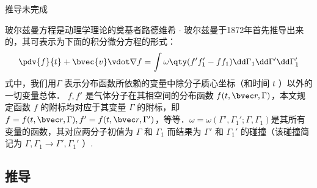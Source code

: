 
\begin{issues}

\issueDraft
推导未完成
\end{issues}

玻尔兹曼方程是动理学理论的奠基者路德维希 $\cdot$ 玻尔兹曼于1872年首先推导出来的，其可表示为下面的积分微分方程的形式：
\begin{equation}
\pdv{f}{t}+\bvec{v}\vdot\nabla f=\int\omega\qty(f'f_1'-ff_1)\dd\Gamma_1\dd\Gamma'\dd\Gamma_1'
\end{equation}
式中，我们用$\Gamma$ 表示分布函数所依赖的变量中除分子质心坐标（和时间 $t$ ）以外的一切变量总体． $f,f'$ 是气体分子在其相空间的分布函数 $f(t,\bvec r,\Gamma)$，本文规定函数 $f$ 的附标均对应于其变量 $\Gamma$ 的附标，即$f=f(t,\bvec r,\Gamma),f'=f(t,\bvec r,\Gamma')$，等等．$\omega=\omega(\Gamma',\Gamma_1';\Gamma,\Gamma_1)$是其所有变量的函数，其对应两分子初值为 $\Gamma$ 和 $\Gamma_1$ 而结果为 $\Gamma'$ 和 $\Gamma_1'$ 的碰撞（该碰撞简记为 $\Gamma,\Gamma_1\rightarrow\Gamma',\Gamma_1'$ ）. 
\subsection{推导}
